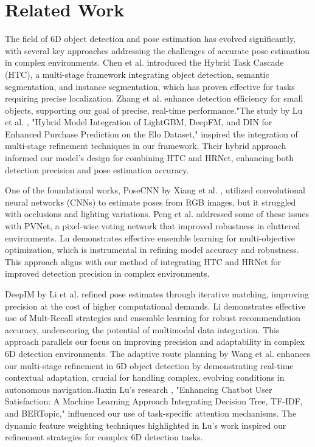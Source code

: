 \section{Related Work}
The field of 6D object detection and pose estimation has evolved significantly, with several key approaches addressing the challenges of accurate pose estimation in complex environments. Chen et al.\cite{chen2019hybrid} introduced the Hybrid Task Cascade (HTC), a multi-stage framework integrating object detection, semantic segmentation, and instance segmentation, which has proven effective for tasks requiring precise localization. Zhang et al. \cite{zhang2024yolo} enhance detection efficiency for small objects, supporting our goal of precise, real-time performance."The study by Lu et al. \cite{202411.1053}, "Hybrid Model Integration of LightGBM, DeepFM, and DIN for Enhanced Purchase Prediction on the Elo Dataset," inspired the integration of multi-stage refinement techniques in our framework. Their hybrid approach informed our model's design for combining HTC and HRNet, enhancing both detection precision and pose estimation accuracy.

One of the foundational works, PoseCNN by Xiang et al.\cite{xiang2017posecnn} , utilized convolutional neural networks (CNNs) to estimate poses from RGB images, but it struggled with occlusions and lighting variations. Peng et al.\cite{peng2019pvnet} addressed some of these issues with PVNet, a pixel-wise voting network that improved robustness in cluttered environments. Lu \cite{lu2024optimizing} demonstrates effective ensemble learning for multi-objective optimization, which is instrumental in refining model accuracy and robustness. This approach aligns with our method of integrating HTC and HRNet for improved detection precision in complex environments.

DeepIM by Li et al.\cite{li2018deepim} refined pose estimates through iterative matching, improving precision at the cost of higher computational demands. Li \cite{li2024harnessing} demonstrates effective use of Mult-Recall strategies and ensemble learning for robust recommendation accuracy, underscoring the potential of multimodal data integration. This approach parallels our focus on improving precision and adaptability in complex 6D detection environments. The adaptive route planning by Wang et al. \cite{wang2024method} enhances our multi-stage refinement in 6D object detection by demonstrating real-time contextual adaptation, crucial for handling complex, evolving conditions in autonomous navigation.Jiaxin Lu’s research \cite{202411.0867}, "Enhancing Chatbot User Satisfaction: A Machine Learning Approach Integrating Decision Tree, TF-IDF, and BERTopic," influenced our use of task-specific attention mechanisms. The dynamic feature weighting techniques highlighted in Lu’s work inspired our refinement strategies for complex 6D detection tasks.

